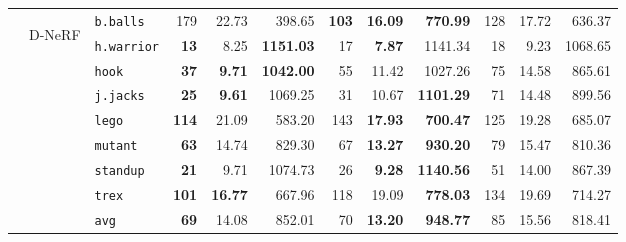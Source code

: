 \documentclass{article}
\theoremstyle{plain}
\theoremstyle{definition}
\theoremstyle{remark}
\begin{document}
\begin{table}[tbp]
{\begin{tabular}{@{\hskip 2pt}cc|@{\hskip 2pt}l@{\hskip 2pt}|@{\hskip 2pt}r@{\hskip 2pt}r@{\hskip 2pt}r|@{\hskip 2pt}r@{\hskip 2pt}r@{\hskip 2pt}r|@{\hskip 2pt}r@{\hskip 2pt}r@{\hskip 2pt}r@{\hskip 2pt}}
& \multirow{9}{*}{\begin{sideways}D-NeRF\end{sideways}}
        & \texttt{b.balls}  & 179 & 22.73 & 398.65 & \bf 103 & \bf 16.09 & \bf 770.99 & 128 & 17.72 & 636.37 \\
        & & \texttt{h.warrior}& \bf 13 & 8.25 & \bf 1151.03 & 17 & \bf 7.87 & 1141.34 & 18 & 9.23 & 1068.65 \\
        & & \texttt{hook}     & \bf 37 & \bf 9.71 & \bf 1042.00 & 55 & 11.42 & 1027.26 & 75 & 14.58 & 865.61 \\
        & & \texttt{j.jacks}  & \bf 25 & \bf 9.61 & 1069.25 & 31 & 10.67 & \bf 1101.29 & 71 & 14.48 & 899.56 \\
        & & \texttt{lego}     & \bf 114 & 21.09 & 583.20 & 143 & \bf 17.93 & \bf 700.47 & 125 & 19.28 & 685.07 \\
        & & \texttt{mutant}   & \bf 63 & 14.74 & 829.30 & 67 & \bf 13.27 & \bf 930.20 & 79 & 15.47 & 810.36 \\
        & & \texttt{standup}  & \bf 21 & 9.71 & 1074.73 & 26 & \bf 9.28 & \bf 1140.56 & 51 & 14.00 & 867.39 \\
        & & \texttt{trex}     & \bf 101 & \bf 16.77 & 667.96 & 118 & 19.09 & \bf 778.03 & 134 & 19.69 & 714.27 \\
    \cmidrule{3-12}
        & & \texttt{avg}
          & \bf 69
          & 14.08
          & 852.01
          & 70
          & \bf 13.20
          & \bf 948.77
          & 85
          & 15.56
          & 818.41 \\
    \bottomrule
    \end{tabular}
    }
  \label{tab:efficiency_combined}
\end{table}
\end{document}
